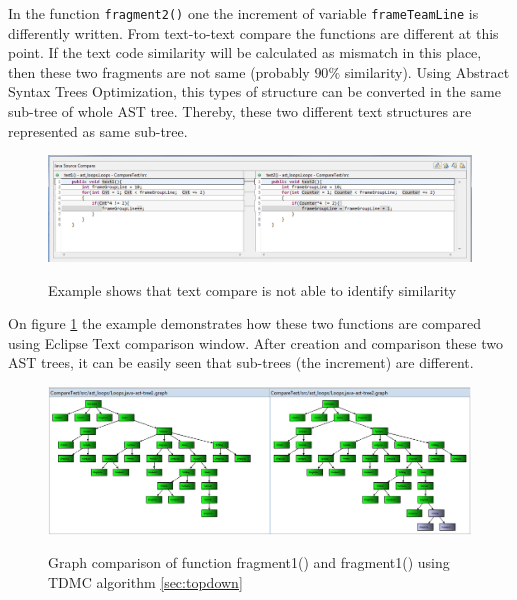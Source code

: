 \documentclass{report}
\begin{document}
In the function \texttt{fragment2()} one the increment of variable \texttt{frameTeamLine} is differently written. From text-to-text compare the functions are different at this point. If the text code similarity will be calculated as mismatch in this place, then these two fragments are not same (probably $90\%$ similarity). Using Abstract Syntax Trees Optimization, this types of structure can be converted in the same sub-tree of whole AST tree. Thereby, these two different text structures are represented as same sub-tree. 

\vspace{4mm}

\begin{figure}[h]
  \centering
  \includegraphics[width=1.00\textwidth]{Figures/AST-optimization/text-to-text-compare}\\[0.1cm]
  \caption[Example shows that text compare is not able to identify similarity]{Example shows that text compare is not able to identify similarity}
  \label{fig:text-to-text-compare}
\end{figure}

On figure \ref{fig:text-to-text-compare} the example demonstrates how these two functions are compared using Eclipse Text comparison window. After creation and comparison these two AST trees, it can be easily seen that sub-trees (the increment) are different.

\begin{figure}[h]
  \centering
  \includegraphics[width=1.00\textwidth]{Figures/AST-optimization/tree-compared1}\\[0.1cm]
  \caption[Graph comparison on similar AST trees using TDMC algorithm]{Graph comparison of function fragment1() and fragment1() using TDMC algorithm \ref{sec:topdown}}
  \label{fig:ast-graph-compare-similar-tdmc}
\end{figure}
\end{document}
